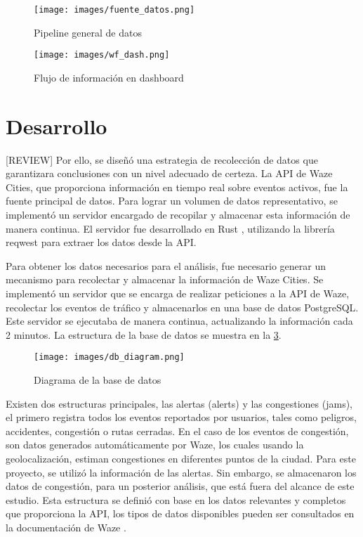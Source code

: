 \documentclass[12pt]{article}
\begin{document}
\begin{figure}[h]
    \centering
    \texttt{[image: images/fuente\_datos.png]}
    \caption{Pipeline general de datos}
    \label{fig:fuente}
\end{figure}

\begin{figure}[h]
    \centering
    \texttt{[image: images/wf\_dash.png]}
    \caption{Flujo de información en dashboard}
    \label{fig:wf_dash}
\end{figure}

\section{Desarrollo}

[REVIEW]
Por ello, se diseñó una estrategia de recolección de datos que garantizara conclusiones con un nivel adecuado de certeza. La API de Waze Cities, que proporciona información en tiempo real sobre eventos activos, fue la fuente principal de datos. Para lograr un volumen de datos representativo, se implementó un servidor encargado de recopilar y almacenar esta información de manera continua. El servidor fue desarrollado en Rust \citep{rust2025}, utilizando la librería reqwest \citep{reqwest2025} para extraer los datos desde la API.

Para obtener los datos necesarios para el análisis, fue necesario generar un mecanismo para recolectar y almacenar la información de Waze Cities. Se implementó un servidor que se encarga de realizar peticiones a la API de Waze, recolectar los eventos de tráfico y almacenarlos en una base de datos PostgreSQL. Este servidor se ejecutaba de manera continua, actualizando la información cada 2 minutos. La estructura de la base de datos se muestra en la \cref{fig:db_diagram}.

\begin{figure}[H]
    \centering
    \texttt{[image: images/db\_diagram.png]}
    \caption{Diagrama de la base de datos}
    \label{fig:db_diagram}
\end{figure}

Existen dos estructuras principales, las alertas (alerts) y las congestiones (jams), el primero registra todos los eventos reportados por usuarios, tales como peligros, accidentes, congestión o rutas cerradas. En el caso de los eventos de congestión, son datos generados automáticamente por Waze, los cuales usando la geolocalización, estiman congestiones en diferentes puntos de la ciudad. Para este proyecto, se utilizó la información de las alertas. Sin embargo, se almacenaron los datos de congestión, para un posterior análisis, que está fuera del alcance de este estudio. Esta estructura se definió con base en los datos relevantes y completos que proporciona la API, los tipos de datos disponibles pueden ser consultados en la documentación de Waze \citep{waze2024}.
\end{document}
